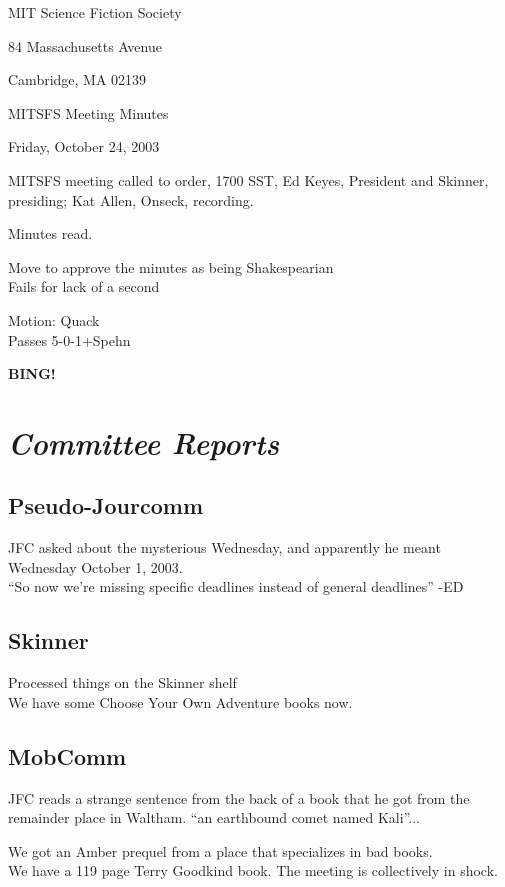 \documentclass[10pt]{article}
\newcommand{\bing}{{\bf BING!} }
\newcommand{\goto}[1]{\bing \vskip 12pt \section*{{\em{#1}}}}
\begin{document}
\begin{center}

MIT Science Fiction Society 

84 Massachusetts Avenue

Cambridge, MA 02139

\vspace{12pt}

MITSFS Meeting Minutes 

Friday, October 24, 2003

\end{center}
 
\vspace{18pt}

\setlength{\parskip}{6pt}

\noindent
MITSFS meeting called to order, 1700 SST, Ed Keyes, President and
Skinner, presiding; Kat Allen,  Onseck, recording.

Minutes read.

Move to approve the minutes as being Shakespearian\\
Fails for lack of a second

Motion: Quack\\
Passes 5-0-1+Spehn

\goto{Committee Reports}
\subsection*{Pseudo-Jourcomm}
JFC asked about the mysterious Wednesday, and apparently he meant
Wednesday October 1, 2003.\\
``So now we're missing specific deadlines instead of general
deadlines'' -ED

\subsection*{Skinner}
Processed things on the Skinner shelf\\
We have some Choose Your Own Adventure books now.
\subsection*{MobComm}
JFC reads a strange sentence from the back of a book that he got from
the remainder place in Waltham.  ``an earthbound comet named Kali''...

We got an Amber prequel from a place that specializes in bad books.\\
We have a 119 page Terry Goodkind book. The meeting is collectively in
shock.
\end{document}
